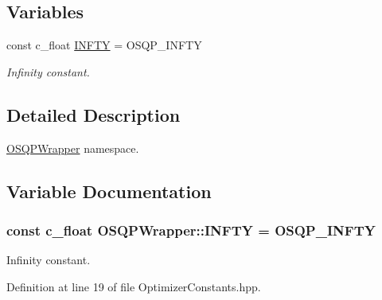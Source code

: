 \subsection*{Variables}
\begin{DoxyCompactItemize}
\item 
const c\+\_\+float \hyperlink{namespaceOSQPWrapper_acd019994292e24a05996343e62593de6}{I\+N\+F\+TY} = O\+S\+Q\+P\+\_\+\+I\+N\+F\+TY
\begin{DoxyCompactList}\small\item\em Infinity constant. \end{DoxyCompactList}\end{DoxyCompactItemize}


\subsection{Detailed Description}
\hyperlink{namespaceOSQPWrapper}{O\+S\+Q\+P\+Wrapper} namespace. 

\subsection{Variable Documentation}
\subsubsection[{\texorpdfstring{I\+N\+F\+TY}{INFTY}}]{\setlength{\rightskip}{0pt plus 5cm}const c\+\_\+float O\+S\+Q\+P\+Wrapper\+::\+I\+N\+F\+TY = O\+S\+Q\+P\+\_\+\+I\+N\+F\+TY}\label{namespaceOSQPWrapper_acd019994292e24a05996343e62593de6}


Infinity constant. 



Definition at line 19 of file Optimizer\+Constants.\+hpp.

